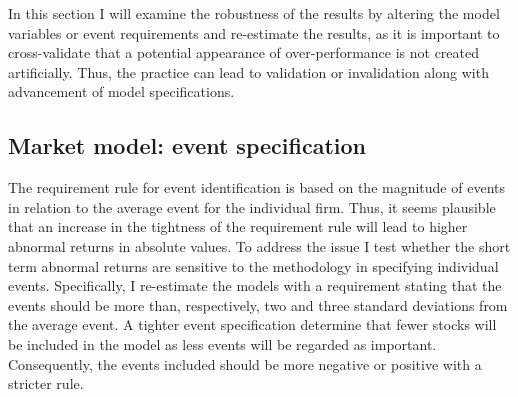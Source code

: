 




In this section I will examine the robustness of the results by altering the model variables or event requirements and re-estimate the results, as it is important to cross-validate that a potential appearance of over-performance is not created artificially. Thus, the practice can lead to validation or invalidation along with advancement of model specifications. 

\subsection{Market model: event specification}
The requirement rule for event identification is based on the magnitude of events in relation to the average event for the individual firm. Thus, it seems plausible that an increase in the tightness of the requirement rule will lead to higher abnormal returns in absolute values.  
To address the issue I test whether the short term abnormal returns are sensitive to the methodology in specifying individual events. Specifically, I re-estimate the models with a requirement stating that the events should be more than, respectively, two and three standard deviations from the average event. A tighter event specification determine that fewer stocks will be included in the model as less events will be regarded as important. Consequently, the events included should be more negative or positive with a stricter rule. 

